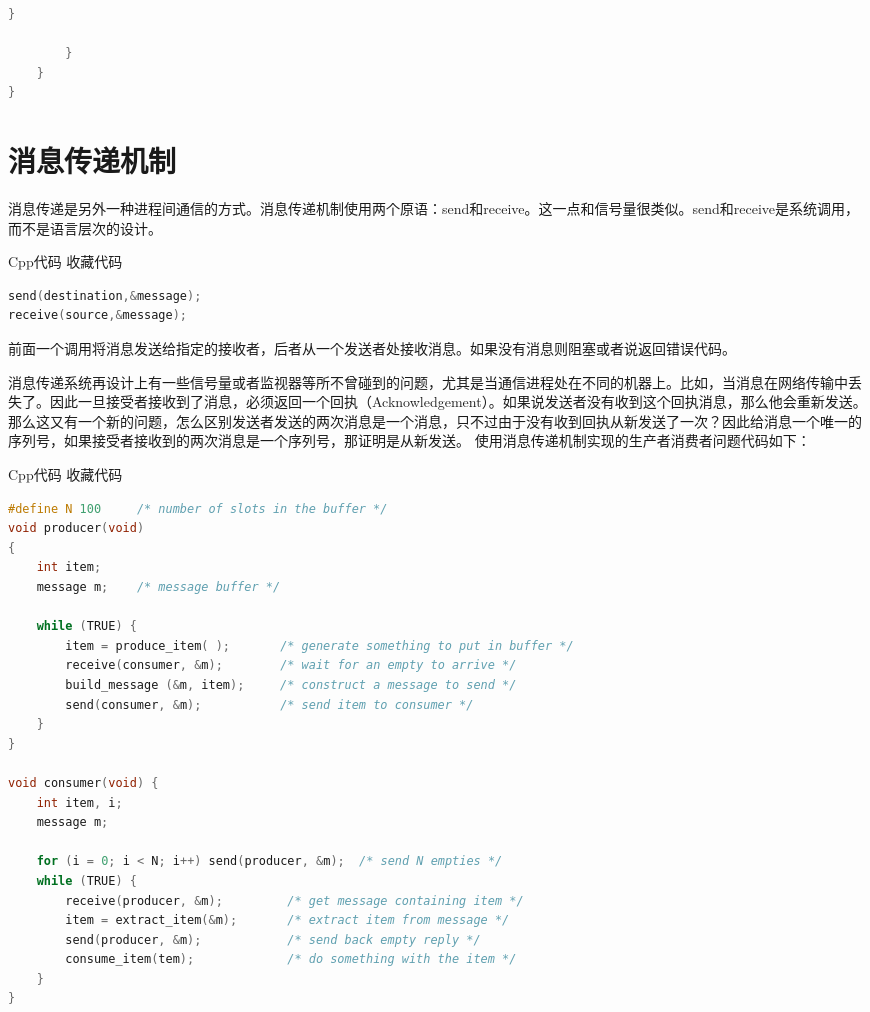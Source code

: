 \documentclass{article}
\begin{document}
\begin{CJK}{UTF8}{gbsn}
\begin{lstlisting}[language=java]
            }  
          
        }  
    }  
}  
\end{lstlisting}


\section{消息传递机制}

消息传递是另外一种进程间通信的方式。消息传递机制使用两个原语：send和receive。这一点和信号量很类似。send和receive是系统调用，而不是语言层次的设计。
 
Cpp代码  收藏代码
\begin{lstlisting}[language=c++]
send(destination,&message);  
receive(source,&message);  
\end{lstlisting}
    前面一个调用将消息发送给指定的接收者，后者从一个发送者处接收消息。如果没有消息则阻塞或者说返回错误代码。
 
    消息传递系统再设计上有一些信号量或者监视器等所不曾碰到的问题，尤其是当通信进程处在不同的机器上。比如，当消息在网络传输中丢失了。因此一旦接受者接收到了消息，必须返回一个回执（Acknowledgement）。如果说发送者没有收到这个回执消息，那么他会重新发送。
    那么这又有一个新的问题，怎么区别发送者发送的两次消息是一个消息，只不过由于没有收到回执从新发送了一次？因此给消息一个唯一的序列号，如果接受者接收到的两次消息是一个序列号，那证明是从新发送。
    使用消息传递机制实现的生产者消费者问题代码如下：
 
Cpp代码  收藏代码
\begin{lstlisting}[language=c++]
#define N 100     /* number of slots in the buffer */  
void producer(void)  
{  
    int item;  
    message m;    /* message buffer */  
   
    while (TRUE) {  
        item = produce_item( );       /* generate something to put in buffer */  
        receive(consumer, &m);        /* wait for an empty to arrive */  
        build_message (&m, item);     /* construct a message to send */  
        send(consumer, &m);           /* send item to consumer */  
    }  
}  
   
void consumer(void) {  
    int item, i;  
    message m;  
   
    for (i = 0; i < N; i++) send(producer, &m);  /* send N empties */  
    while (TRUE) {  
        receive(producer, &m);         /* get message containing item */  
        item = extract_item(&m);       /* extract item from message */  
        send(producer, &m);            /* send back empty reply */  
        consume_item(tem);             /* do something with the item */  
    }  
}  
\end{lstlisting}



\end{CJK}
\end{document}
